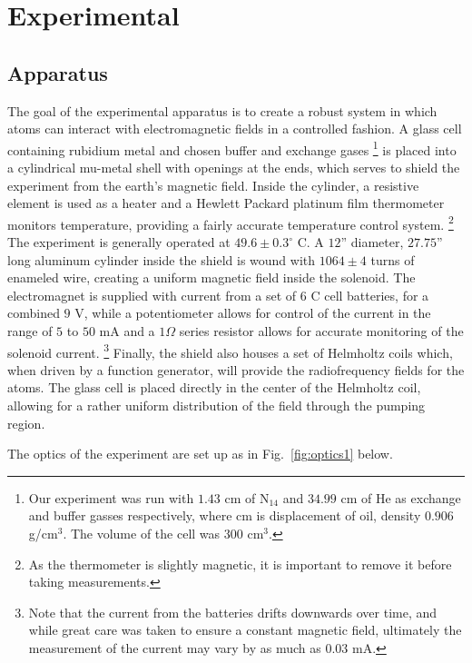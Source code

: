 
\section{Experimental}\label{experimental}

\subsection{Apparatus}\label{apparatus}

The goal of the experimental apparatus is to create a robust system in which atoms can interact with electromagnetic fields in a controlled fashion. A glass cell containing rubidium metal and chosen buffer and exchange gases \footnote{Our experiment was run with $1.43$ cm of N$_{14}$ and $34.99$ cm of He as exchange and buffer gasses respectively, where cm is displacement of oil, density $0.906$ g/cm$^{3}$. The volume of the cell was $300$ cm$^{3}$.} is placed into a cylindrical mu-metal shell with openings at the ends, which serves to shield the experiment from the earth's magnetic field. Inside the cylinder, a resistive element is used as a heater and a Hewlett Packard platinum film thermometer monitors temperature, providing a fairly accurate temperature control system. \footnote{As the thermometer is slightly magnetic, it is important to remove it before taking measurements.} The experiment is generally operated at $49.6\pm0.3^{\circ}$ C. A $12$'' diameter, $27.75$'' long aluminum cylinder inside the shield is wound with $1064\pm4$ turns of enameled wire, creating a uniform magnetic field inside the solenoid. The electromagnet is supplied with current from a set of $6$ C cell batteries, for a combined $9$ V, while a potentiometer allows for control of the current in the range of $5$ to $50$ mA and a $1 \Omega$ series resistor allows for accurate monitoring of the solenoid current. \footnote{Note that the current from the batteries drifts downwards over time, and while great care was taken to ensure a constant magnetic field, ultimately the measurement of the current may vary by as much as $0.03$ mA.} Finally, the shield also houses a set of Helmholtz coils which, when driven by a function generator, will provide the radiofrequency fields for the atoms. The glass cell is placed directly in the center of the Helmholtz coil, allowing for a rather uniform distribution of the field through the pumping region.

The optics of the experiment are set up as in Fig.~\ref{fig:optics1} below.


